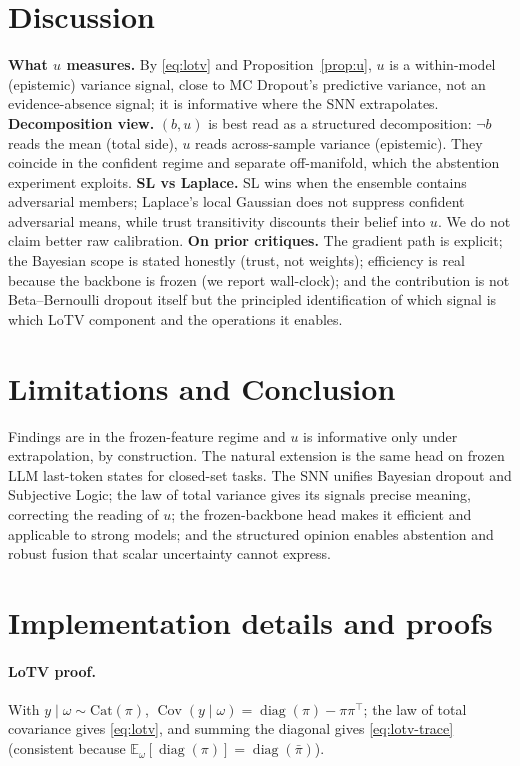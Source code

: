 \documentclass[11pt]{article}
\newcommand{\Eb}{\mathbb{E}}
\newcommand{\Cov}{\operatorname{Cov}}
\newcommand{\diag}{\operatorname{diag}}
\begin{document}
\section{Discussion}
\textbf{What $u$ measures.} By \eqref{eq:lotv} and Proposition~\ref{prop:u}, $u$ is a
within-model (epistemic) variance signal, close to MC Dropout's predictive variance, not
an evidence-absence signal; it is informative where the SNN extrapolates.
\textbf{Decomposition view.} $(b,u)$ is best read as a structured decomposition: $\neg b$
reads the mean (total side), $u$ reads across-sample variance (epistemic). They coincide
in the confident regime and separate off-manifold, which the abstention experiment
exploits. \textbf{SL vs Laplace.} SL wins when the ensemble contains adversarial members;
Laplace's local Gaussian does not suppress confident adversarial means, while trust
transitivity discounts their belief into $u$. We do not claim better raw calibration.
\textbf{On prior critiques.} The gradient path is explicit; the Bayesian scope is stated
honestly (trust, not weights); efficiency is real because the backbone is frozen (we
report wall-clock); and the contribution is not Beta--Bernoulli dropout itself but the
principled identification of which signal is which LoTV component and the operations it
enables.

\section{Limitations and Conclusion}
Findings are in the frozen-feature regime and $u$ is informative only under
extrapolation, by construction. The natural extension is the same head on frozen LLM
last-token states for closed-set tasks. The SNN unifies Bayesian dropout and Subjective
Logic; the law of total variance gives its signals precise meaning, correcting the
reading of $u$; the frozen-backbone head makes it efficient and applicable to strong
models; and the structured opinion enables abstention and robust fusion that scalar
uncertainty cannot express.

\appendix
\section{Implementation details and proofs}
\label{app:impl}
\paragraph{LoTV proof.} With $y\mid\omega\sim\mathrm{Cat}(\pi)$,
$\Cov(y\mid\omega)=\diag(\pi)-\pi\pi^\top$; the law of total covariance gives
\eqref{eq:lotv}, and summing the diagonal gives \eqref{eq:lotv-trace} (consistent
because $\Eb_\omega[\diag(\pi)]=\diag(\bar\pi)$).
\end{document}
